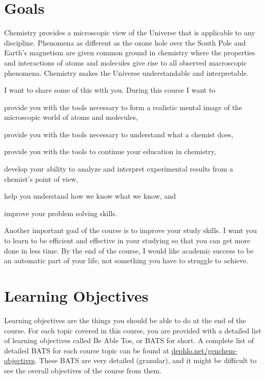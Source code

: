 \documentclass[letterpaper,oneside,onecolumn,11pt,article]{memoir}
\begin{document}
\section{Goals}
Chemistry provides a microscopic view of the Universe that is applicable to any discipline. Phenomena as different as the ozone hole over the South Pole and Earth's magnetism are given common ground in chemistry where the properties and interactions of atoms and molecules give rise to all observed macroscopic phenomena. Chemistry makes the Universe understandable and interpretable. 

I want to share some of this with you. During this course I want to 
\begin{inparaenum}
\item provide you with the tools necessary to form a realistic mental image of the microscopic world of atoms and molecules,
\item provide you with the tools necessary to understand what a chemist does,
\item provide you with the tools to continue your education in chemistry,
\item develop your ability to analyze and interpret experimental results from a chemist's point of view,
\item help you understand how we know what we know, and
\item improve your problem solving skills.
\end{inparaenum}

Another important goal of the course is to improve your study skills. I want you to learn to be efficient and effective in your studying so that you can get more done in less time. By the end of the course, I would like academic success to be an automatic part of your life, not something you have to struggle to achieve. 
%
%
\section{Learning Objectives}
Learning objectives are the things you should be able to do at the end of the course. For each topic covered in this course, you are provided with a detailed list of learning objectives called Be Able Tos, or BATS for short. A complete list of detailed BATS for each course topic can be found at \href{http://dephlo.net/chem110/lecture/objectives}{dephlo.net/genchem-objectives}. These BATS are very detailed (granular), and it might be difficult to see the overall objectives of the course from them. 
\end{document}
